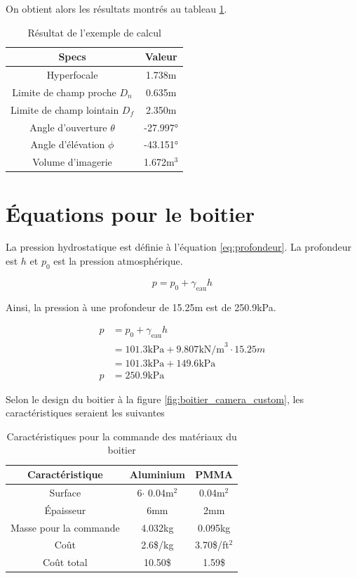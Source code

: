 On obtient alors les résultats montrés au tableau \ref{t:resultat_calcul_camera_custom}.
\begin{table}[!htb]
\footnotesize
\centering
    \begin{tabular}{|c|c|}
    \hline
    Specs & Valeur\\
    \hline\hline
    Hyperfocale & 1.738m\\
    Limite de champ proche $D_n$ & 0.635m\\
    Limite de champ lointain $D_f$ & 2.350m\\
    Angle d'ouverture $\theta$ & -27.997°\\
    Angle d'élévation $\phi$ & -43.151°\\
    Volume d'imagerie & 1.672m$^3$\\
    \hline
    \end{tabular}
\caption{Résultat de l'exemple de calcul}
\label{t:resultat_calcul_camera_custom}
\end{table}


\chapter{Équations pour le boitier}
\label{annexe:equation_boitier}

La pression hydrostatique est définie à l'équation \ref{eq:profondeur}. La profondeur est $h$ et $p_0$ est la pression atmosphérique.

\begin{equation}
    p = p_0 +\gamma_\text{eau} h
    \label{eq:profondeur}
\end{equation}

Ainsi, la pression à une profondeur de 15.25m est de 250.9kPa.

\begin{align}
    p &= p_0 +\gamma_\text{eau} h\\
    &= 101.3\text{kPa} + 9.807\text{kN/m}^3 \cdot 15.25m\\
    &= 101.3\text{kPa} + 149.6\text{kPa}\\
    p &= 250.9\text{kPa}
\end{align}

Selon le design du boitier à la figure \ref{fig:boitier_camera_custom}, les caractéristiques seraient les suivantes 

\begin{table}[!htb]
\footnotesize
\centering
    \begin{tabular}{|c|c|c|}
    \hline
    Caractéristique & Aluminium & PMMA\\
    \hline\hline
    Surface & 6$\cdot$ 0.04m$^2$ & 0.04m$^2$\\
    Épaisseur & 6mm & 2mm\\
    Masse pour la commande & 4.032kg & 0.095kg\\
    Coût & 2.6\$/kg & 3.70\$/ft$^2$ \\
    \hline
    Coût total & 10.50\$ & 1.59\$ \\
    \hline
    \end{tabular}
\caption{Caractéristiques pour la commande des matériaux du boitier \cite{PMMA_cout} \cite{Aluminium_cout}}
\label{t:commande_boitier}
\end{table}

